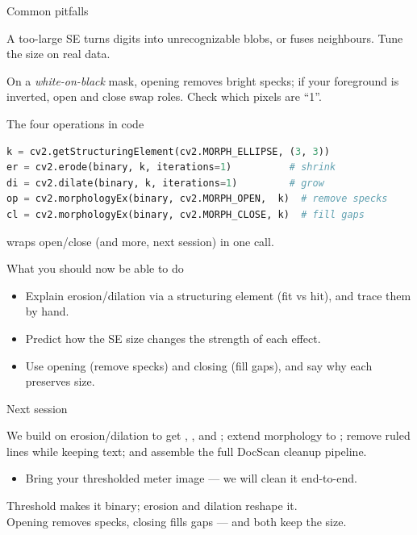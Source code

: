 \documentclass[10pt,aspectratio=169]{beamer}
\begin{document}
\begin{frame}{Common pitfalls}
  \begin{badbox}[Oversized SE]
    A too-large SE turns digits into unrecognizable blobs, or fuses neighbours. Tune the size on real data.
  \end{badbox}
  \begin{badbox}
    On a \emph{white-on-black} mask, opening removes bright specks; if your foreground is inverted, open and close swap roles. Check which pixels are ``1''.
  \end{badbox}
\end{frame}

\begin{frame}[fragile]{The four operations in code}
\begin{lstlisting}[language=Python]
k = cv2.getStructuringElement(cv2.MORPH_ELLIPSE, (3, 3))
er = cv2.erode(binary, k, iterations=1)          # shrink
di = cv2.dilate(binary, k, iterations=1)         # grow
op = cv2.morphologyEx(binary, cv2.MORPH_OPEN,  k)  # remove specks
cl = cv2.morphologyEx(binary, cv2.MORPH_CLOSE, k)  # fill gaps
\end{lstlisting}
   wraps open/close (and more, next session) in one call.
\end{frame}

\begin{frame}{What you should now be able to do}
  \begin{itemize}
    \item Explain erosion/dilation via a structuring element (fit vs hit), and trace them by hand.
    \item Predict how the SE size changes the strength of each effect.
    \item Use opening (remove specks) and closing (fill gaps), and say why each preserves size.
  \end{itemize}
\end{frame}

\begin{frame}{Next session}
  \begin{infobox}
    We build on erosion/dilation to get , , and ; extend morphology to ; remove ruled lines while keeping text; and assemble the full DocScan cleanup pipeline.
  \end{infobox}
  \begin{itemize}
    \item Bring your thresholded meter image — we will clean it end-to-end.
  \end{itemize}
\end{frame}

\begin{frame}[standout]
  Threshold makes it binary; erosion and dilation reshape it.\\[4pt]
  \normalsize Opening removes specks, closing fills gaps — and both keep the size.
\end{frame}
\end{document}
